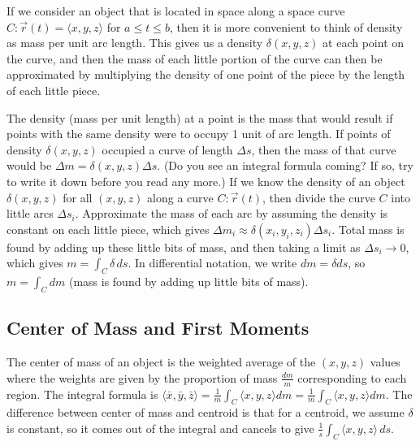 If we consider an object that is located in space along a space curve
$C\colon\vec r (t)=\langle x,y,z\rangle$ for $a\leq t\leq b$, then it is more
convenient to think of density as mass per unit arc length.  This
gives us a density $\delta(x,y,z)$ at each point on the curve, and then the
mass of each little portion of the curve can then be approximated by
multiplying the density of one point of the piece by the length of
each little piece.

The density  (mass per unit length) at a point is the mass that would
result if points with the same density were to occupy 1 unit of arc
length. If points of density $\delta(x,y,z)$ occupied a curve of length $\Delta
s$, then the mass of that curve would be $\Delta m = \delta(x,y,z)\Delta s$. (Do you
see an integral formula coming? If so, try to write it down before you
read any more.) If we know the density of an object $\delta(x,y,z)$ for 
all $(x,y,z)$ along a curve $C\colon\vec r(t)$, then divide the curve $C$
into little arcs $\Delta s_{i}$. Approximate the mass of each arc by
assuming the density is constant on each little piece, which gives $\Delta
m_{i} \approx \delta(x_i,y_i,z_i)\Delta s_{i}$. Total mass is found by adding up these
little bits of mass, and then taking a limit as $\Delta s_{i}\to 0$, which
gives $m=\int_C \delta \,ds$.  In differential notation, we write $dm = \delta ds$,
 so $m=\int_C dm$ (mass is found by adding up little bits of mass).  

\subsection{Center of Mass and First Moments}

The center of mass of an object is the weighted average of the
$(x,y,z)$ values where the weights are given by the proportion of mass
$\frac{dm}{m}$ corresponding to each region. The integral formula is
$\langle\bar x,\bar y,\bar z\rangle = \frac{1}{m}\int_C
\langle x,y,z\rangle dm = \frac{1}{m}\int_C \langle x,y,z\rangle dm$. The
difference between center of mass and centroid is that for a centroid,
we assume $\delta$ is constant, so it comes out of the integral and cancels to give $\frac 1 s \int_C \langle x,y,z\rangle\,ds$.  

